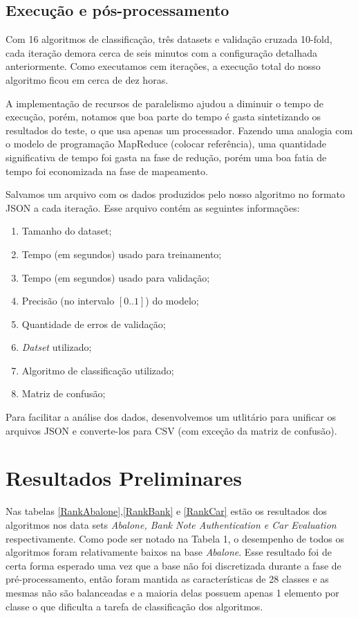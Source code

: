 \documentclass[11pt]{article}
\begin{document}
\subsection{Execução e pós-processamento}

Com 16 algoritmos de classificação, três datasets e validação cruzada 10-fold,
cada iteração demora cerca de seis minutos com a configuração detalhada
anteriormente. Como executamos cem iterações, a execução total do nosso
algoritmo ficou em cerca de dez horas.

A implementação de recursos de paralelismo ajudou a diminuir o tempo de
execução, porém, notamos que boa parte do tempo é gasta sintetizando os
resultados do teste, o que usa apenas um processador. Fazendo uma analogia com
o modelo de programação MapReduce (colocar referência), uma quantidade
significativa de tempo foi gasta na fase de redução, porém uma boa fatia de
tempo foi economizada na fase de mapeamento.

Salvamos um arquivo com os dados produzidos pelo nosso algoritmo no formato
JSON a cada iteração. Esse arquivo contém as seguintes informações:

\begin{enumerate}
    \item Tamanho do dataset;
    \item Tempo (em segundos) usado para treinamento;
    \item Tempo (em segundos) usado para validação;
    \item Precisão (no intervalo $[0..1]$) do modelo;
    \item Quantidade de erros de validação;
    \item \textit{Datset} utilizado;
    \item Algoritmo de classificação utilizado;
    \item Matriz de confusão;
\end{enumerate}

Para facilitar a análise dos dados, desenvolvemos um utlitário para unificar os
arquivos JSON e converte-los para CSV (com exceção da matriz de confusão).

\section{Resultados Preliminares}
    Nas tabelas \ref{RankAbalone},\ref{RankBank} e \ref{RankCar} estão os resultados dos algoritmos nos data sets \emph{Abalone, Bank Note Authentication e Car Evaluation} respectivamente. Como pode ser notado na Tabela 1, o desempenho de todos os algoritmos foram relativamente baixos na base \emph{Abalone}. Esse resultado foi de certa forma esperado uma vez que a base não foi discretizada durante a fase de pré-processamento, então foram mantida as características de 28 classes e as mesmas não são balanceadas e a maioria delas possuem apenas 1 elemento por classe o que dificulta a tarefa de classificação dos algoritmos.
    
\end{document}
